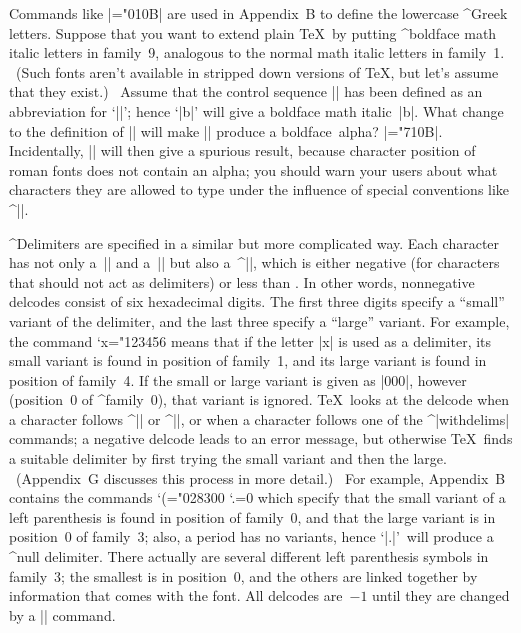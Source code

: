 \ddangerexercise Commands like |\mathchardef\alpha="010B| are used in
Appendix~B to define the lowercase ^{Greek} letters. Suppose that you want
to extend plain \TeX\ by putting ^{boldface math italic} letters
in family~9, analogous to the normal math italic letters in family~1.
\ (Such fonts aren't available in stripped down versions of \TeX, but
let's assume that they exist.) \ Assume that the control sequence
|\bmit| has been defined as an abbreviation for `||'; hence
`|{\bmit b}|' will give a boldface math italic~|b|. What change to the
definition of\/ |\alpha| will make |{\bmit\alpha}| produce a boldface~alpha?
\checkequals\bmiexno\exno
\answer |\mathchardef\alpha="710B|. Incidentally, |{\rm\alpha}| will
then give a spurious result, because character position  of
roman fonts does not contain an alpha; you should warn
your users about what characters they are allowed to type under the
influence of special conventions like ^|\rm|.

\ddanger ^{Delimiters} are specified in a similar but more complicated
way. Each character has not only a~|\catcode| and a~|\mathcode| but also
a~^|\delcode|, which is either negative (for characters that should not
act as delimiters) or less than . In other words,
nonnegative delcodes consist of six hexadecimal digits. The first three
digits specify a ``small'' variant of the delimiter, and the last three
specify a ``large'' variant. For example, the command
\begintt
\delcode`x="123456
\endtt
means that if the letter |x| is used as a delimiter, its small variant
is found in position  of family~1, and its large variant is found
in position  of family~4. If the small or large variant is
given as |000|, however (position~0 of ^{family~0}), that variant is ignored.
\TeX\ looks at the delcode when a character follows ^|\left| or ^|\right|,
or when a character follows one of the ^|withdelims| commands; a
negative delcode leads to an error message, but otherwise \TeX\ finds
a suitable delimiter by first trying the small variant and then
the large. \ (Appendix~G discusses this process in more detail.) \
For example, Appendix~B contains the commands
\begintt
\delcode`(="028300  \delcode`.=0
\endtt
which specify that the small variant of a left parenthesis is found in
position \hex{28} of family~0, and that the large variant is in position~0
of family~3; also, a period has no variants, hence `|\left.|'\ will produce
a ^{null delimiter}. There actually are several different left parenthesis
symbols in family~3; the smallest is in position~0, and the others are
linked together by information that comes with the font. All delcodes
are~$-1$ until they are changed by a |\delcode| command.

